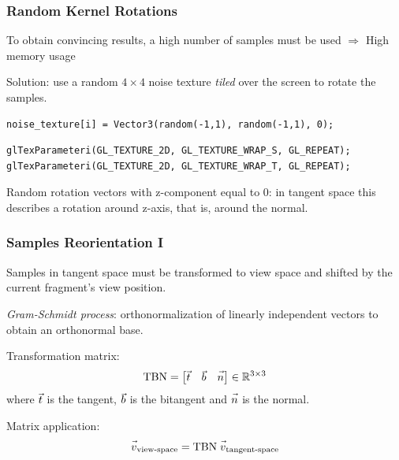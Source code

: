 \documentclass{beamer}
\let\nvec\vec
\def\vec#1{\nvec{\vphantom t\smash{#1}}}
\begin{document}
\begin{frame}[fragile]
\frametitle{Random Kernel Rotations}
To obtain convincing results, a high number of samples must be used $ \Rightarrow $ High memory usage

Solution: use a random $ 4\times4 $ noise texture \emph{tiled} over the screen to rotate the samples.
\begin{verbatim}
noise_texture[i] = Vector3(random(-1,1), random(-1,1), 0);
\end{verbatim}
\vspace{-1cm}
\begin{verbatim}
glTexParameteri(GL_TEXTURE_2D, GL_TEXTURE_WRAP_S, GL_REPEAT);
glTexParameteri(GL_TEXTURE_2D, GL_TEXTURE_WRAP_T, GL_REPEAT);
\end{verbatim} 

Random rotation vectors with z-component equal to 0: in tangent space this describes a rotation around z-axis, that is, around the normal.

\end{frame}

\begin{frame}
\frametitle{Samples Reorientation I}
Samples in tangent space must be transformed to view space and shifted by the current fragment's view position.

\emph{Gram-Schmidt process}: orthonormalization of linearly independent vectors to obtain an orthonormal base.

Transformation matrix:
\[
\text{TBN} = 
\begin{bmatrix}
\vec{t} & \vec{b} & \vec{n}
\end{bmatrix} \in \mathbb{R}^{3\times3}
\]
where $ \vec{t} $ is the tangent, $ \vec{b} $ is the bitangent and $ \vec{n} $ is the normal.

Matrix application:
\[ \vec{v}_{\text{view-space}} = \text{TBN} \; \vec{v}_{\text{tangent-space}} \]
\end{frame}
\end{document}
